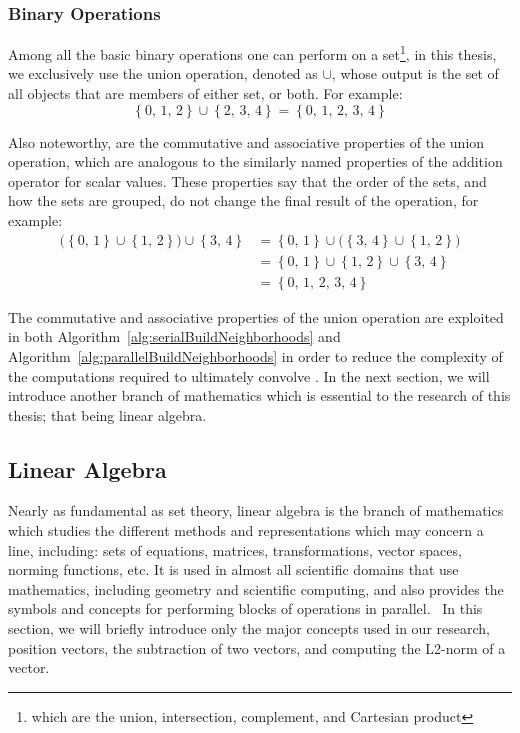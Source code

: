 %
%
\subsubsection{Binary Operations}
\label{ch2sETBssSTsssBO}
Among all the basic binary operations one can perform on a set\footnote{which are the union, intersection, complement, and Cartesian product}, in this thesis, we exclusively use the union operation, denoted as $\cup$, whose output is the set of all objects that are members of either set, or both. For example:
%
\begin{equation}
	\left \{0,\,1,\,2\right \} \cup \left \{2,\,3,\,4\right \} = \left \{0,\,1,\,2,\,3,\,4\right \}
\end{equation}

Also noteworthy, are the commutative and associative properties of the union operation, which are analogous to the similarly named properties of the addition operator for scalar values. These properties say that the order of the sets, and how the sets are grouped, do not change the final result of the operation, for example:
%
\begin{equation}
\begin{aligned}
	\big( \left \{0,\,1\right \} \cup \left \{1,\,2\right \} \big) \cup \left \{3,\,4\right \} & = \left \{0,\,1\right \} \cup \big( \left \{3,\,4\right \} \cup \left \{1,\,2\right \}\big) \\
	& = \left \{0,\,1\right \} \cup \left \{1,\,2\right \} \cup \left \{3,\,4\right \} \\
	& = \left \{0,\,1,\,2,\,3,\,4\right \}
	\label{eq:ascAndComPropertiesOfUnions}
\end{aligned}
\end{equation}

The commutative and associative properties of the union operation are exploited in both Algorithm~\ref{alg:serialBuildNeighborhoods} and Algorithm~\ref{alg:parallelBuildNeighborhoods} in order to reduce the complexity of the computations required to ultimately convolve . In the next section, we will introduce another branch of mathematics which is essential to the research of this thesis; that being linear algebra.

%
%
%
%
\subsection{Linear Algebra}
\label{ch2sETBssLA}
Nearly as fundamental as set theory, linear algebra is the branch of mathematics which studies the different methods and representations which may concern a line, including: sets of equations, matrices, transformations, vector spaces, norming functions, etc. It is used in almost all scientific domains that use mathematics, including geometry and scientific computing, and also provides the symbols and concepts for performing blocks of operations in parallel.~\cite{Weisstein19i} In this section, we will briefly introduce only the major concepts used in our research, position vectors, the subtraction of two vectors, and computing the L2-norm of a vector.


